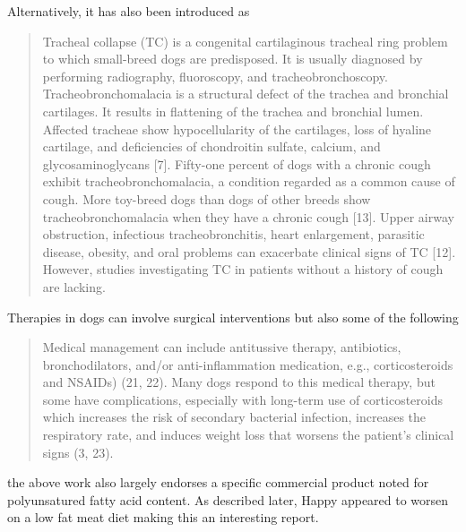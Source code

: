 {Alternatively, it has also been introduced as 
\cite{PMC5746443}
\begin{quote}
Tracheal collapse (TC) is a congenital cartilaginous tracheal ring problem
to which small-breed dogs are predisposed. It is usually diagnosed by performing
radiography, fluoroscopy, and tracheobronchoscopy. Tracheobronchomalacia
is a structural defect of the trachea and bronchial cartilages. It results
in flattening of the trachea and bronchial lumen. Affected tracheae show
hypocellularity of the cartilages, loss of hyaline cartilage, and deficiencies
of chondroitin sulfate, calcium, and glycosaminoglycans {[}7{]}. Fifty-one
percent of dogs with a chronic cough exhibit tracheobronchomalacia, a condition
regarded as a common cause of cough. More toy-breed dogs than dogs of other
breeds show tracheobronchomalacia when they have a chronic cough {[}13{]}.
Upper airway obstruction, infectious tracheobronchitis, heart enlargement,
parasitic disease, obesity, and oral problems can exacerbate clinical signs
of TC {[}12{]}. However, studies investigating TC in patients without a
history of cough are lacking.
\end{quote}


Therapies in dogs can involve surgical interventions but also
some of the following 
\cite{PMC9330478}
\begin{quote}
Medical management can include antitussive therapy, antibiotics, bronchodilators,
and/or anti-inflammation medication, e.g., corticosteroids and NSAIDs) (21,
22). Many dogs respond to this medical therapy, but some have complications,
especially with long-term use of corticosteroids which increases the risk
of secondary bacterial infection, increases the respiratory rate, and induces
weight loss that worsens the patient's clinical signs (3, 23).
\end{quote}

the above work also largely endorses a specific commercial product
noted for polyunsatured fatty acid content. As described later, Happy
appeared to worsen on a low fat meat diet making this an interesting
report. 


}
